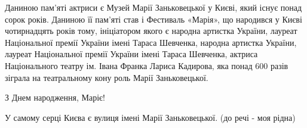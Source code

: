 Даниною пам’яті актриси є Музей Марії Заньковецької у Києві, який існує понад
сорок років. Даниною її пам’яті став і Фестиваль «Марія», що народився у Києві
чотирнадцять років тому, ініціатором якого є народна артистка України, лауреат
Національної премії України імені Тараса Шевченка, народна артистка України,
лауреат Національної премії України імені Тараса Шевченка, актриса
Національного театру ім. Івана Франка Лариса Кадирова, яка понад 600 разів
зіграла на театральному кону роль Марії Заньковецької.

З Днем народження, Маріє!

У самому серці Києва є вулиця імені Марії Заньковецької. (до речі - моя рідна)

